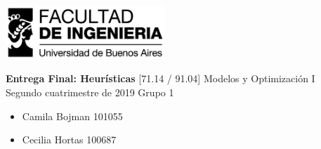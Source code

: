 \documentclass[a4paper]{article}
\newcommand{\materia}{[71.14 / 91.04] Modelos y Optimización I}
\newcommand{\trabajo}{Entrega Final: Heurísticas}
\newcommand{\cuatrimestre}{Segundo cuatrimestre de 2019}
\newcommand{\grupo}{Grupo 1}
\begin{document}
\setcounter{page}{1}
	
\begin{titlepage}
	\hfill\includegraphics[width=6cm]{fiuba.jpg}
    \begin{center}
    \vfill
    \Huge \textbf{\trabajo}
    \vskip2cm
    \Large \materia\\
    \cuatrimestre
    \vfill
    \grupo
	\begin{itemize}
		\item Camila Bojman 101055
		\item Cecilia Hortas 100687
	\end{itemize}
    \vskip1cm
    \end{center}
\end{titlepage}
\end{document}
